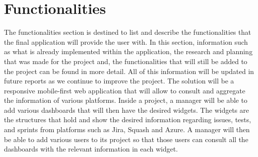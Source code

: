 \documentclass[a4paper,twoside,10pt]{report}
\begin{document}
\chapter{Functionalities}
The functionalities section is destined to list and describe the functionalities that the final application will provide the user with.
\newline
In this section, information such as what is already implemented within the application, the research and planning that was made for the project and, the functionalities that will still be added to the project can be found in more detail.
\newline
All of this information will be updated in future reports as we continue to improve the project.
\newline
\newline
The solution will be a responsive mobile-first web application that will allow to consult and aggregate the information of various platforms. Inside a project, a manager will be able to add various dashboards that will then have the desired widgets. The widgets are the structures that hold and show the desired information regarding issues, tests, and sprints from platforms such as Jira\cite{JIRA}, Squash\cite{SQUASH} and Azure\cite{AZURE}. A manager will then be able to add various users to its project so that those users can consult all the dashboards with the relevant information in each widget.
\end{document}
